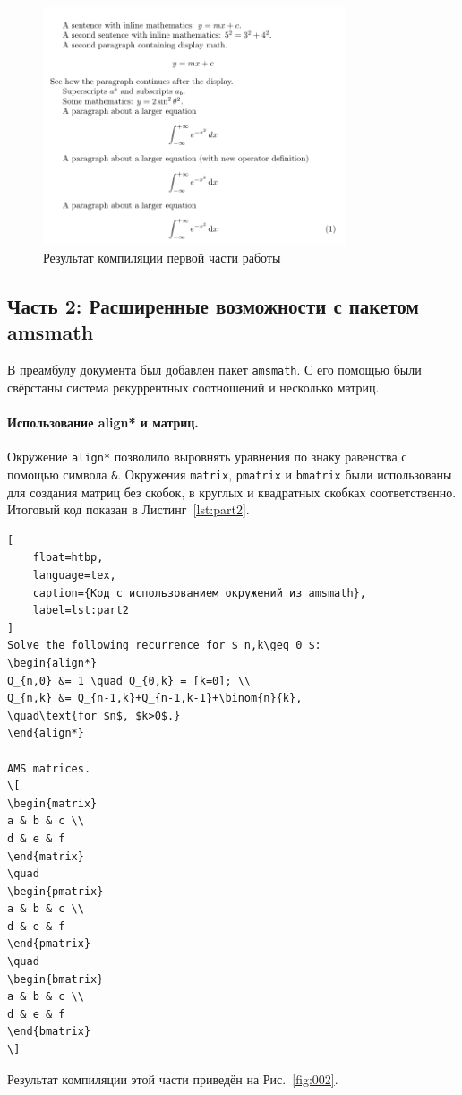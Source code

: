 \documentclass[a4paper, 12pt]{article}
\renewcommand{\figurename}{Рис.}
\renewcommand{\lstlistingname}{Листинг}
\begin{document}
\begin{figure}[H]
    \centering
    \includegraphics[width=0.8\textwidth]{image/1.png}
    \caption{Результат компиляции первой части работы}
    \label{fig:001}
\end{figure}

\subsection{Часть 2: Расширенные возможности с пакетом amsmath}
В преамбулу документа был добавлен пакет \texttt{amsmath}. С его помощью были свёрстаны система рекуррентных соотношений и несколько матриц.

\paragraph{Использование align* и матриц.}
Окружение \texttt{align*} позволило выровнять уравнения по знаку равенства с помощью символа \texttt{\&}. Окружения \texttt{matrix}, \texttt{pmatrix} и \texttt{bmatrix} были использованы для создания матриц без скобок, в круглых и квадратных скобках соответственно. Итоговый код показан в \lstlistingname~\ref{lst:part2}.

\begin{lstlisting}[
    float=htbp,
    language=tex,
    caption={Код с использованием окружений из amsmath},
    label=lst:part2
]
Solve the following recurrence for $ n,k\geq 0 $:
\begin{align*}
Q_{n,0} &= 1 \quad Q_{0,k} = [k=0]; \\
Q_{n,k} &= Q_{n-1,k}+Q_{n-1,k-1}+\binom{n}{k},
\quad\text{for $n$, $k>0$.}
\end{align*}

AMS matrices.
\[
\begin{matrix}
a & b & c \\
d & e & f
\end{matrix}
\quad
\begin{pmatrix}
a & b & c \\
d & e & f
\end{pmatrix}
\quad
\begin{bmatrix}
a & b & c \\
d & e & f
\end{bmatrix}
\]
\end{lstlisting}
Результат компиляции этой части приведён на \figurename~\ref{fig:002}.
\end{document}
